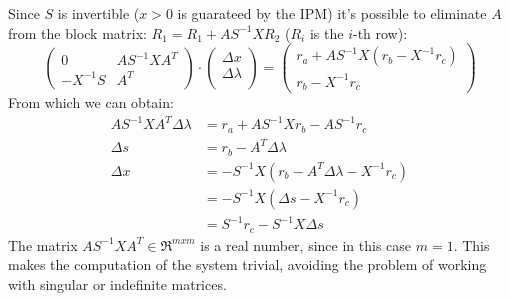 \documentclass[]{article}
\begin{document}
Since $S$ is invertible ($x > 0$ is guarateed by the IPM) it's possible to eliminate $A$ from the block matrix: $R_1 = R_1 +AS^{-1}XR_2$ ($R_i$ is the $i$-th row):
\begin{equation*}
\begin{pmatrix}
0 & AS^{-1}XA^T\\
-X^{-1}S & A^T
\end{pmatrix}
\cdot
\begin{pmatrix}
\Delta x \\[0.3em]
\Delta \lambda \\[0.3em]
\end{pmatrix}
=
\begin{pmatrix}
r_a + AS^{-1}X(r_b-X^{-1}r_c)\\
r_b-X^{-1}r_c
\end{pmatrix}
\end{equation*}
From which we can obtain:
\begin{equation*}
	\begin{split}
	AS^{-1}XA^T\Delta\lambda&=r_a+AS^{-1}Xr_b-AS^{-1}r_c\\
	\Delta s &= r_b-A^T\Delta \lambda\\
	\Delta x &=-S^{-1}X(r_b-A^T\Delta \lambda - X^{-1}r_c)\\
	&=-S^{-1}X(\Delta s - X^{-1}r_c)\\
	&= S^{-1}r_c-S^{-1}X\Delta s
	\end{split}
\end{equation*}
The matrix $AS^{-1}XA^T \in \Re^{mxm}$ is a real number, since in this case $m=1$. This makes the computation of the system trivial, avoiding the problem of working with singular or indefinite matrices.
\end{document}
